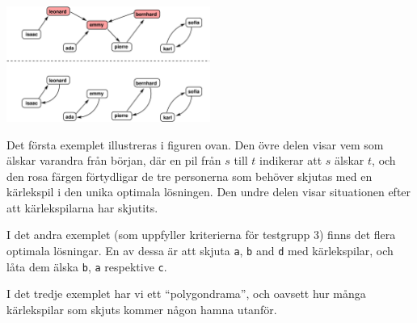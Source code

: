 \section*{\sampleexplanations}

\begin{center}
\includegraphics[width=0.5\textwidth]{polygonfig.pdf}
\end{center}
Det första exemplet illustreras i figuren ovan. Den övre delen visar vem som älskar varandra från början, där en pil från $s$ till $t$ indikerar att $s$ älskar $t$,
och den rosa färgen förtydligar de tre personerna som behöver skjutas med en kärlekspil i den unika optimala lösningen. Den undre delen visar situationen efter att kärlekspilarna har skjutits.

I det andra exemplet (som uppfyller kriterierna för testgrupp 3) finns det flera optimala lösningar.
En av dessa är att skjuta \texttt{a}, \texttt{b} and \texttt{d} med kärlekspilar, och låta dem älska \texttt{b}, \texttt{a} respektive \texttt{c}.

I det tredje exemplet har vi ett ``polygondrama'', och oavsett hur många kärlekspilar som 
skjuts kommer någon hamna utanför.
